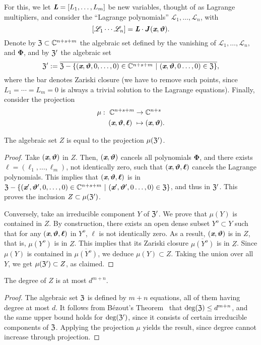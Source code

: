 \documentclass[sigconf]{acmart}
\def\thetab{\bm{\vartheta}}
\def\xb{\textit{\textbf{x}}}
\def\C{\mathbb{C}}
\def\dt{s}
\begin{document}
For this, we let $\textit{\textbf{L}}=[L_1,\hdots,L_m]$ be new
variables, thought of as Lagrange multipliers, and consider the
``Lagrange polynomials'' $\mathscr{L}_1,\dots,\mathscr{L}_{n}$, with
\[
[\mathscr{L}_1 \cdots \mathscr{L}_{n}]=\textit{\textbf{L}}\cdot \bm J(\xb,\thetab).
\] 
Denote by $\frak{Z} \subset \C^{n+\dt+m}$ the algebraic set defined by
the vanishing of $\mathscr{L}_1,\hdots,\mathscr{L}_{n},$ and
$\bm\Phi$, and by $\frak{Z}'$ the algebraic set
\[
\frak{Z}' := \overline{\frak{Z} - \{(\xb,\thetab,0,\hdots,0) \in \C^{n+\dt+m}~|~(\xb,\thetab,0\hdots,0) \in \frak{Z}\}},
\]
where the bar denotes Zariski closure (we have to remove such points,
since $L_1=\cdots=L_m=0$ is always a trivial solution to the Lagrange
equations). Finally, consider the projection
\begin{align*} 
\mu :~ \C^{n+\dt+m} &\rightarrow \C^{n+\dt}\\
(\xb,\thetab,\bm \ell)~ &\mapsto (\xb,\thetab).
\end{align*}

\begin{lemma}  
  The algebraic set $Z$ is equal to the projection $\mu(\frak{Z}')$.
\end{lemma}
\begin{proof}
  Take $(\xb,\thetab)$ in $Z$. Then, $(\xb,\thetab)$ cancels all
  polynomials $\bm \Phi$, and there exists $\bm
  \ell=(\ell_1,\dots,\ell_m)$, not identically zero, such that
  $(\xb,\thetab,\bm \ell)$ cancels the Lagrange polynomials. This
  implies that $(\xb,\thetab,\bm \ell)$ is in $\frak{Z} -
  \{(\xb',\thetab',0,\hdots,0) \in
  \C^{n+\dt+m}~|~(\xb',\thetab',0\hdots,0) \in
  \frak{Z}\}$, and thus in $\frak{Z}'$. This proves the inclusion
  $Z \subset \mu(\frak{Z}')$.

  Conversely, take an irreducible component $Y$ of $\frak Z'$. We
  prove that $\mu(Y)$ is contained in $Z$.  By construction, there
  exists an open dense subset $Y^o \subset Y$ such that for any
  $(\xb,\thetab,\bm \ell)$ in $Y^o$, $\bm \ell$ is not identically
  zero. As a result, $(\xb,\thetab)$ is in $Z$, that is, $\mu(Y^o)$ is
  in $Z$. This implies that its Zariski closure $\overline{\mu(Y^o)}$
  is in $Z$. Since $\mu(Y)$ is contained in $\overline{\mu(Y^o)}$, we
  deduce $\mu(Y) \subset Z$. Taking the union over all $Y$, we get
  $\mu(\frak Z') \subset Z$, as claimed.
\end{proof}
%
\begin{corollary} 
  The degree of $Z$ is at most $d^{m+n}.$
\end{corollary}
\begin{proof}
  The algebraic set $\frak Z$ is defined by $m+n$ equations, all of
  them having degree at most $d$. It follows from B\'ezout's
  Theorem~\cite{H} that $\deg(\frak{Z}) \leq d^{m+n}$, and the same
  upper bound holds for $\deg(\frak{Z}')$, since it consists of
  certain irreducible components of $\frak Z$. Applying the projection
  $\mu$ yields the result, since degree cannot increase through
  projection.
\end{proof}
\end{document}
